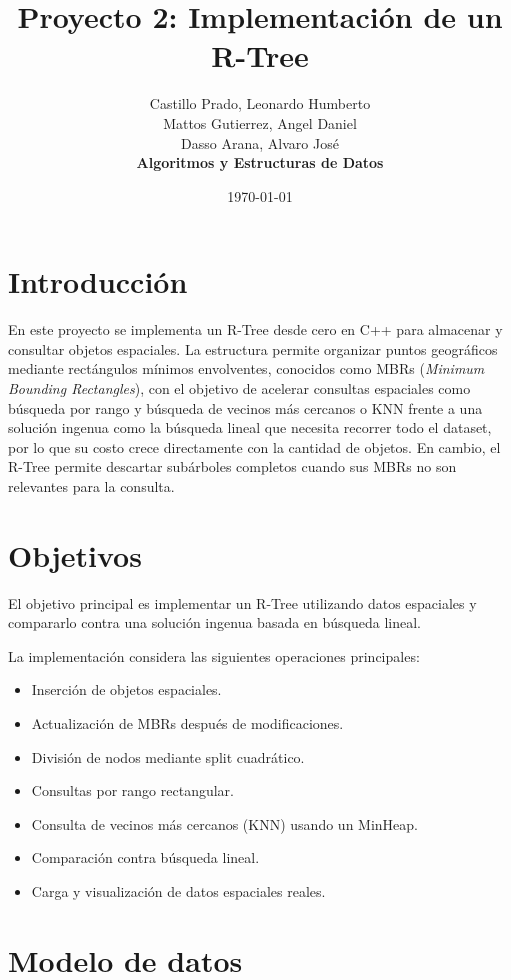 \documentclass[11pt,a4paper]{article}
\title{\textbf{Proyecto 2: Implementación de un R-Tree}}
\author{
Castillo Prado, Leonardo Humberto\\
Mattos Gutierrez, Angel Daniel\\
Dasso Arana, Alvaro José\\[0.2cm]
\textbf{Algoritmos y Estructuras de Datos}
}
\date{\today}
\begin{document}
\maketitle

\section{Introducción}

En este proyecto se implementa un R-Tree desde cero en C++ para almacenar y consultar objetos espaciales. La estructura permite organizar puntos geográficos mediante rectángulos mínimos envolventes, conocidos como MBRs (\textit{Minimum Bounding Rectangles}), con el objetivo de acelerar consultas espaciales como búsqueda por rango y búsqueda de vecinos más cercanos o KNN frente a una solución ingenua como la búsqueda lineal que necesita recorrer todo el dataset, por lo que su costo crece directamente con la cantidad de objetos. En cambio, el R-Tree permite descartar subárboles completos cuando sus MBRs no son relevantes para la consulta.

\section{Objetivos}

El objetivo principal es implementar un R-Tree utilizando datos espaciales y compararlo contra una solución ingenua basada en búsqueda lineal.

La implementación considera las siguientes operaciones principales:

\begin{itemize}
    \item Inserción de objetos espaciales.
    \item Actualización de MBRs después de modificaciones.
    \item División de nodos mediante split cuadrático.
    \item Consultas por rango rectangular.
    \item Consulta de vecinos más cercanos (KNN) usando un MinHeap.
    \item Comparación contra búsqueda lineal.
    \item Carga y visualización de datos espaciales reales.
\end{itemize}

\section{Modelo de datos}
\end{document}
